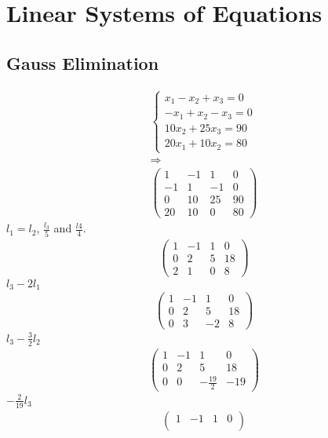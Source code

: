 \section{Linear Systems of Equations}
\subsection{Gauss Elimination}
\begin{myExample}
	\begin{eqnarray*}
		\begin{cases}
			x_1-x_2+x_3=0\\
			-x_1+x_2-x_3=0\\
			10x_2+25x_3=90\\
			20x_1+10x_2=80
		\end{cases}
		\\
		\Rightarrow
		\\
		\begin{pmatrix}
			1 & -1 & 1 & 0\\
			-1&1&-1&0\\
			0&10&25&90\\
			20&10&0&80
		\end{pmatrix}
	\end{eqnarray*}
	$l_1=l_2$, $\frac{l_3}{5}$ and $\frac{l4}{4}$.
	\begin{eqnarray*}
		\begin{pmatrix}
			1 & -1 & 1 & 0\\
			0&2&5&18\\
			2&1&0&8
		\end{pmatrix}
	\end{eqnarray*}
	$l_3-2l_1$
	\begin{eqnarray*}
		\begin{pmatrix}
			1 & -1 & 1 & 0\\
			0&2&5&18\\
			0&3&-2&8
		\end{pmatrix}
	\end{eqnarray*}
	$l_3-\frac{3}{2}l_2$
	\begin{eqnarray*}
		\begin{pmatrix}
			1 & -1 & 1 & 0\\
			0&2&5&18\\
			0&0&-\frac{19}{2}&-19
		\end{pmatrix}
	\end{eqnarray*}
	$-\frac{2}{19}l_3$
	\begin{eqnarray*}
		\begin{pmatrix}
			1 & -1 & 1 & 0\\

\end{pmatrix}
\end{eqnarray*}
\end{myExample}
